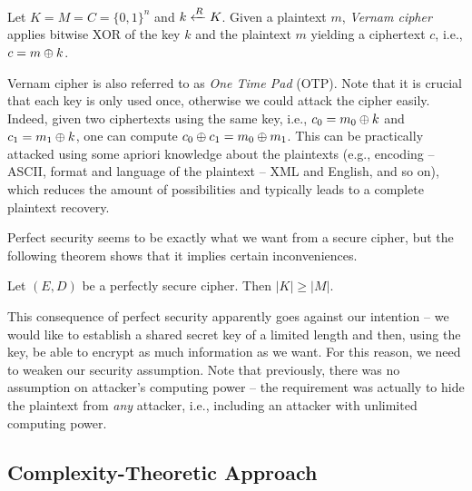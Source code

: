 \begin{example}
	Let $K = M = C = \{0,1\}^n$ and $k\xleftarrow{R} K$. Given a plaintext $m$, {\em Vernam cipher} applies bitwise XOR of the key $k$ and the plaintext $m$ yielding a ciphertext $c$, i.e., $c = m\oplus k$.
\end{example}

\begin{note}
	Vernam cipher is also referred to as {\em One Time Pad} (OTP). Note that it is crucial that each key is only used once, otherwise we could attack the cipher easily. Indeed, given two ciphertexts using the same key, i.e., $c_0=m_0\oplus k$ and $c_1=m_1\oplus k$, one can compute $c_0\oplus c_1 = m_0\oplus m_1$. This can be practically attacked using some apriori knowledge about the plaintexts (e.g., encoding -- ASCII, format and language of the plaintext -- XML and English, and so on), which reduces the amount of possibilities and typically leads to a complete plaintext recovery.
\end{note}

Perfect security seems to be exactly what we want from a secure cipher, but the following theorem shows that it implies certain inconveniences.

\begin{thm}
\label{thm:kgeqm}
	Let $(E,D)$ be a perfectly secure cipher. Then $|K| \geq |M|$.
\end{thm}

\begin{note}
\label{note:intent}
	This consequence of perfect security apparently goes against our intention -- we would like to establish a shared secret key of a limited length and then, using the key, be able to encrypt as much information as we want. For this reason, we need to weaken our security assumption. Note that previously, there was no assumption on attacker's computing power -- the requirement was actually to hide the  plaintext from {\em any} attacker, i.e., including an attacker with unlimited computing power.
\end{note}



\subsection{Complexity-Theoretic Approach}


